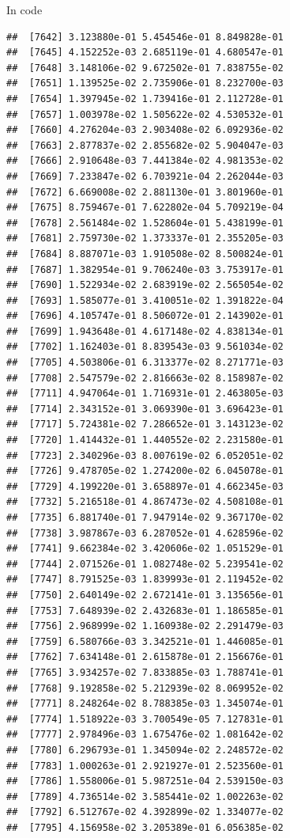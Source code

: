 \documentclass[ignorenonframetext,]{beamer}
\begin{document}
\begin{frame}[fragile]{In code}
\begin{verbatim}
##  [7642] 3.123880e-01 5.454546e-01 8.849828e-01
##  [7645] 4.152252e-03 2.685119e-01 4.680547e-01
##  [7648] 3.148106e-02 9.672502e-01 7.838755e-02
##  [7651] 1.139525e-02 2.735906e-01 8.232700e-03
##  [7654] 1.397945e-02 1.739416e-01 2.112728e-01
##  [7657] 1.003978e-02 1.505622e-02 4.530532e-01
##  [7660] 4.276204e-03 2.903408e-02 6.092936e-02
##  [7663] 2.877837e-02 2.855682e-02 5.904047e-03
##  [7666] 2.910648e-03 7.441384e-02 4.981353e-02
##  [7669] 7.233847e-02 6.703921e-04 2.262044e-03
##  [7672] 6.669008e-02 2.881130e-01 3.801960e-01
##  [7675] 8.759467e-01 7.622802e-04 5.709219e-04
##  [7678] 2.561484e-02 1.528604e-01 5.438199e-01
##  [7681] 2.759730e-02 1.373337e-01 2.355205e-03
##  [7684] 8.887071e-03 1.910508e-02 8.500824e-01
##  [7687] 1.382954e-01 9.706240e-03 3.753917e-01
##  [7690] 1.522934e-02 2.683919e-02 2.565054e-02
##  [7693] 1.585077e-01 3.410051e-02 1.391822e-04
##  [7696] 4.105747e-01 8.506072e-01 2.143902e-01
##  [7699] 1.943648e-01 4.617148e-02 4.838134e-01
##  [7702] 1.162403e-01 8.839543e-03 9.561034e-02
##  [7705] 4.503806e-01 6.313377e-02 8.271771e-03
##  [7708] 2.547579e-02 2.816663e-02 8.158987e-02
##  [7711] 4.947064e-01 1.716931e-01 2.463805e-03
##  [7714] 2.343152e-01 3.069390e-01 3.696423e-01
##  [7717] 5.724381e-02 7.286652e-01 3.143123e-02
##  [7720] 1.414432e-01 1.440552e-02 2.231580e-01
##  [7723] 2.340296e-03 8.007619e-02 6.052051e-02
##  [7726] 9.478705e-02 1.274200e-02 6.045078e-01
##  [7729] 4.199220e-01 3.658897e-01 4.662345e-03
##  [7732] 5.216518e-01 4.867473e-02 4.508108e-01
##  [7735] 6.881740e-01 7.947914e-02 9.367170e-02
##  [7738] 3.987867e-03 6.287052e-01 4.628596e-02
##  [7741] 9.662384e-02 3.420606e-02 1.051529e-01
##  [7744] 2.071526e-01 1.082748e-02 5.239541e-02
##  [7747] 8.791525e-03 1.839993e-01 2.119452e-02
##  [7750] 2.640149e-02 2.672141e-01 3.135656e-01
##  [7753] 7.648939e-02 2.432683e-01 1.186585e-01
##  [7756] 2.968999e-02 1.160938e-02 2.291479e-03
##  [7759] 6.580766e-03 3.342521e-01 1.446085e-01
##  [7762] 7.634148e-01 2.615878e-01 2.156676e-01
##  [7765] 3.934257e-02 7.833885e-03 1.788741e-01
##  [7768] 9.192858e-02 5.212939e-02 8.069952e-02
##  [7771] 8.248264e-02 8.788385e-03 1.345074e-01
##  [7774] 1.518922e-03 3.700549e-05 7.127831e-01
##  [7777] 2.978496e-03 1.675476e-02 1.081642e-02
##  [7780] 6.296793e-01 1.345094e-02 2.248572e-02
##  [7783] 1.000263e-01 2.921927e-01 2.523560e-01
##  [7786] 1.558006e-01 5.987251e-04 2.539150e-03
##  [7789] 4.736514e-02 3.585441e-02 1.002263e-02
##  [7792] 6.512767e-02 4.392899e-02 1.334077e-02
##  [7795] 4.156958e-02 3.205389e-01 6.056385e-02

\end{verbatim}
\end{frame}
\end{document}
